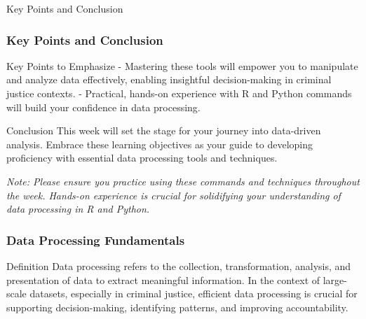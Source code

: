 \documentclass[aspectratio=169]{beamer}
\begin{document}
\begin{frame}[fragile]{Key Points and Conclusion}
    \frametitle{Key Points and Conclusion}

    \begin{block}{Key Points to Emphasize}
        - Mastering these tools will empower you to manipulate and analyze data effectively, enabling insightful decision-making in criminal justice contexts.
        - Practical, hands-on experience with R and Python commands will build your confidence in data processing.
    \end{block}

    \begin{block}{Conclusion}
        This week will set the stage for your journey into data-driven analysis. Embrace these learning objectives as your guide to developing proficiency with essential data processing tools and techniques.
    \end{block}

    \textit{Note: Please ensure you practice using these commands and techniques throughout the week. Hands-on experience is crucial for solidifying your understanding of data processing in R and Python.}
\end{frame}

\begin{frame}
    \frametitle{Data Processing Fundamentals}
    \begin{block}{Definition}
        Data processing refers to the collection, transformation, analysis, and presentation of data to extract meaningful information. In the context of large-scale datasets, especially in criminal justice, efficient data processing is crucial for supporting decision-making, identifying patterns, and improving accountability.
    \end{block}
\end{frame}
\end{document}
